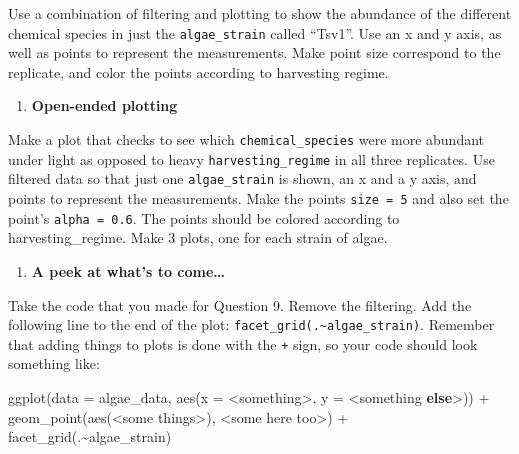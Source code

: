 \documentclass[
]{krantz}
\newenvironment{Shaded}{\begin{snugshade}}{\end{snugshade}}
\newcommand{\AttributeTok}[1]{\textcolor[rgb]{0.77,0.63,0.00}{#1}}
\newcommand{\ControlFlowTok}[1]{\textcolor[rgb]{0.13,0.29,0.53}{\textbf{#1}}}
\newcommand{\FunctionTok}[1]{\textcolor[rgb]{0.00,0.00,0.00}{#1}}
\newcommand{\NormalTok}[1]{#1}
\newcommand{\SpecialCharTok}[1]{\textcolor[rgb]{0.00,0.00,0.00}{#1}}
\providecommand{\tightlist}{%
  \setlength{\itemsep}{0pt}\setlength{\parskip}{0pt}}
\begin{document}
Use a combination of filtering and plotting to show the abundance of the different chemical species in just the \texttt{algae\_strain} called ``Tsv1''. Use an x and y axis, as well as points to represent the measurements. Make point size correspond to the replicate, and color the points according to harvesting regime.

\begin{enumerate}
\def\labelenumi{\arabic{enumi}.}
\setcounter{enumi}{7}
\tightlist
\item
  \textbf{Open-ended plotting}
\end{enumerate}

Make a plot that checks to see which \texttt{chemical\_species} were more abundant under light as opposed to heavy \texttt{harvesting\_regime} in all three replicates. Use filtered data so that just one \texttt{algae\_strain} is shown, an x and a y axis, and points to represent the measurements. Make the points \texttt{size\ =\ 5} and also set the point's \texttt{alpha\ =\ 0.6}. The points should be colored according to harvesting\_regime. Make 3 plots, one for each strain of algae.

\begin{enumerate}
\def\labelenumi{\arabic{enumi}.}
\setcounter{enumi}{8}
\tightlist
\item
  \textbf{A peek at what's to come\ldots{}}
\end{enumerate}

Take the code that you made for Question 9. Remove the filtering. Add the following line to the end of the plot: \texttt{facet\_grid(.\textasciitilde{}algae\_strain)}. Remember that adding things to plots is done with the \texttt{+} sign, so your code should look something like:

\begin{Shaded}
\begin{Highlighting}[]
\FunctionTok{ggplot}\NormalTok{(}\AttributeTok{data =}\NormalTok{ algae\_data, }\FunctionTok{aes}\NormalTok{(}\AttributeTok{x =} \SpecialCharTok{\textless{}}\NormalTok{something}\SpecialCharTok{\textgreater{}}\NormalTok{, }\AttributeTok{y =} \SpecialCharTok{\textless{}}\NormalTok{something }\ControlFlowTok{else}\SpecialCharTok{\textgreater{}}\NormalTok{)) }\SpecialCharTok{+}
  \FunctionTok{geom\_point}\NormalTok{(}\FunctionTok{aes}\NormalTok{(}\SpecialCharTok{\textless{}}\NormalTok{some things}\SpecialCharTok{\textgreater{}}\NormalTok{), }\SpecialCharTok{\textless{}}\NormalTok{some here too}\SpecialCharTok{\textgreater{}}\NormalTok{) }\SpecialCharTok{+}
  \FunctionTok{facet\_grid}\NormalTok{(.}\SpecialCharTok{\textasciitilde{}}\NormalTok{algae\_strain)}
\end{Highlighting}
\end{Shaded}
\end{document}
